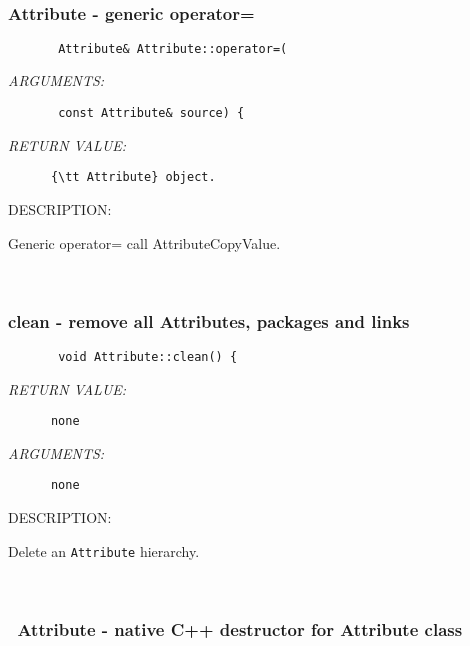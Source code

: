  
\mbox{}\hrulefill\
 
\subsubsection [Attribute] {Attribute - generic operator=}


  
\begin{verbatim}       Attribute& Attribute::operator=(\end{verbatim}{\em ARGUMENTS:}
\begin{verbatim}       const Attribute& source) {
   \end{verbatim}{\em RETURN VALUE:}
\begin{verbatim}      {\tt Attribute} object.
   \end{verbatim}
{\sf DESCRIPTION:\\ }


      Generic operator= call AttributeCopyValue.
   
 
\mbox{}\hrulefill\
 
\subsubsection [clean] {clean - remove all Attributes, packages and links}


  
\begin{verbatim}       void Attribute::clean() {\end{verbatim}{\em RETURN VALUE:}
\begin{verbatim}      none\end{verbatim}{\em ARGUMENTS:}
\begin{verbatim}      none\end{verbatim}
{\sf DESCRIPTION:\\ }


      Delete an {\tt Attribute} hierarchy.
   
 
\mbox{}\hrulefill\
 
\subsubsection [~Attribute] {~Attribute - native C++ destructor for Attribute class}


